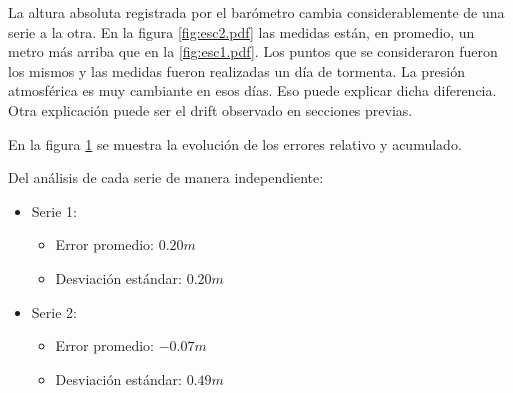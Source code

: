 \documentclass[main]{subfiles}
\begin{document}
La altura absoluta registrada por el bar\'ometro cambia considerablemente de una serie a la otra. En la figura \ref{fig:esc2.pdf} las medidas est\'an, en promedio, un metro m\'as arriba que en la \ref{fig:esc1.pdf}. Los puntos que se consideraron fueron los mismos y las medidas fueron realizadas un d\'ia de tormenta. La presi\'on atmosf\'erica es muy cambiante en esos d\'ias. Eso puede explicar dicha diferencia. Otra explicaci\'on puede ser el drift observado en secciones previas.

En la figura \ref{fig:1-metro-err} se muestra la evoluci\'on de los errores relativo y acumulado.

\begin{figure}
\vspace{-40pt}

  \caption{}
\label{fig:1-metro-err}
\vspace{-110pt}
\end{figure}

Del an\'alisis de cada serie de manera independiente:
\begin{itemize}
\item Serie 1:
		\begin{itemize}
		\item Error promedio: $0.20m$
		\item Desviaci\'on est\'andar: $0.20m$
		\end{itemize}
\item Serie 2:
		\begin{itemize}
		\item Error promedio: $-0.07m$
		\item Desviaci\'on est\'andar: $0.49m$
		\end{itemize}
\end{itemize}
\end{document}
